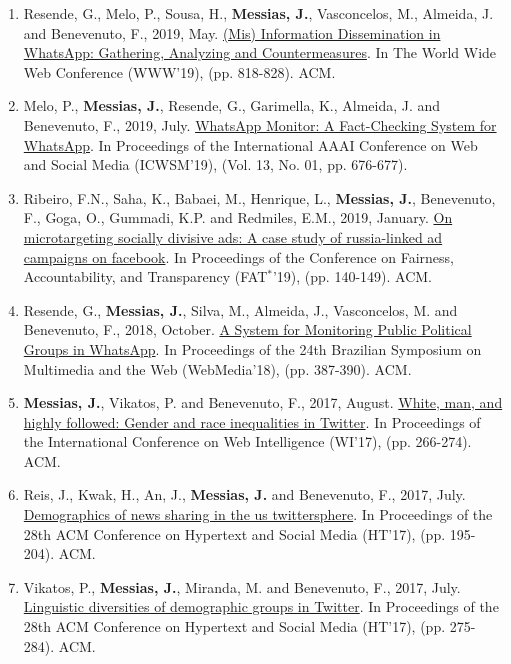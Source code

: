 \begin{enumerate}

    \item Resende, G., Melo, P., Sousa, H., \textbf{Messias, J.}, Vasconcelos, M., Almeida, J. and Benevenuto, F., 2019, May. \href{https://people.mpi-sws.org/~johnme/pdf/resende_www2019_whatsapp.pdf}{(Mis) Information Dissemination in WhatsApp: Gathering, Analyzing and Countermeasures}. In The World Wide Web Conference (WWW'19), (pp. 818-828). ACM.
    \item Melo, P., \textbf{Messias, J.}, Resende, G., Garimella, K., Almeida, J. and Benevenuto, F., 2019, July. \href{https://people.mpi-sws.org/~johnme/pdf/melo-icwsm-2019-demo.pdf}{WhatsApp Monitor: A Fact-Checking System for WhatsApp}. In Proceedings of the International AAAI Conference on Web and Social Media (ICWSM'19), (Vol. 13, No. 01, pp. 676-677).
    \item Ribeiro, F.N., Saha, K., Babaei, M., Henrique, L., \textbf{Messias, J.}, Benevenuto, F., Goga, O., Gummadi, K.P. and Redmiles, E.M., 2019, January. \href{https://people.mpi-sws.org/~johnme/pdf/ribeiro_fat19_ira_ads.pdf}{On microtargeting socially divisive ads: A case study of russia-linked ad campaigns on facebook}. In Proceedings of the Conference on Fairness, Accountability, and Transparency (FAT$^{*}$'19), (pp. 140-149). ACM.
    \item Resende, G., \textbf{Messias, J.}, Silva, M., Almeida, J., Vasconcelos, M. and Benevenuto, F., 2018, October. \href{https://people.mpi-sws.org/~johnme/pdf/resende_webmedia2018_whatsapp.pdf}{A System for Monitoring Public Political Groups in WhatsApp}. In Proceedings of the 24th Brazilian Symposium on Multimedia and the Web (WebMedia'18), (pp. 387-390). ACM.
    \item \textbf{Messias, J.}, Vikatos, P. and Benevenuto, F., 2017, August. \href{https://people.mpi-sws.org/~johnme/pdf/messias_wi17_inequality.pdf}{White, man, and highly followed: Gender and race inequalities in Twitter}. In Proceedings of the International Conference on Web Intelligence (WI'17), (pp. 266-274). ACM.
    \item Reis, J., Kwak, H., An, J., \textbf{Messias, J.} and Benevenuto, F., 2017, July. \href{https://people.mpi-sws.org/~johnme/pdf/reis_ht17_news-sharing.pdf}{Demographics of news sharing in the us twittersphere}. In Proceedings of the 28th ACM Conference on Hypertext and Social Media (HT'17), (pp. 195-204). ACM.
    \item Vikatos, P., \textbf{Messias, J.}, Miranda, M. and Benevenuto, F., 2017, July. \href{https://people.mpi-sws.org/~johnme/pdf/vikatos_ht17_linguistic-diversity.pdf}{Linguistic diversities of demographic groups in Twitter}. In Proceedings of the 28th ACM Conference on Hypertext and Social Media (HT'17), (pp. 275-284). ACM.

\end{enumerate}
